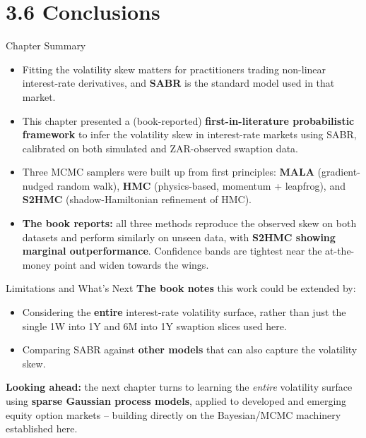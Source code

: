 \documentclass[aspectratio=169,10pt]{beamer}
\begin{document}
\section{3.6 Conclusions}

\begin{frame}{Chapter Summary}
  \begin{itemize}
    \item Fitting the volatility skew matters for practitioners trading
      non-linear interest-rate derivatives, and \textbf{SABR} is the standard
      model used in that market.
    \item This chapter presented a (book-reported) \textbf{first-in-literature
      probabilistic framework} to infer the volatility skew in interest-rate
      markets using SABR, calibrated on both simulated and ZAR-observed
      swaption data.
    \item Three MCMC samplers were built up from first principles:
      \textbf{MALA} (gradient-nudged random walk),
      \textbf{HMC} (physics-based, momentum + leapfrog),
      and \textbf{S2HMC} (shadow-Hamiltonian refinement of HMC).
    \item \textbf{The book reports:} all three methods reproduce the observed
      skew on both datasets and perform similarly on unseen data, with
      \textbf{S2HMC showing marginal outperformance}. Confidence bands are
      tightest near the at-the-money point and widen towards the wings.
  \end{itemize}
\end{frame}

\begin{frame}{Limitations and What's Next}
  \textbf{The book notes} this work could be extended by:
  \begin{itemize}
    \item Considering the \textbf{entire} interest-rate volatility surface,
      rather than just the single 1W into 1Y and 6M into 1Y swaption slices
      used here.
    \item Comparing SABR against \textbf{other models} that can also capture
      the volatility skew.
  \end{itemize}

  \vspace{3mm}
  \textbf{Looking ahead:} the next chapter turns to learning the
  \emph{entire} volatility surface using \textbf{sparse Gaussian process
  models}, applied to developed and emerging equity option markets --
  building directly on the Bayesian/MCMC machinery established here.
\end{frame}
\end{document}
